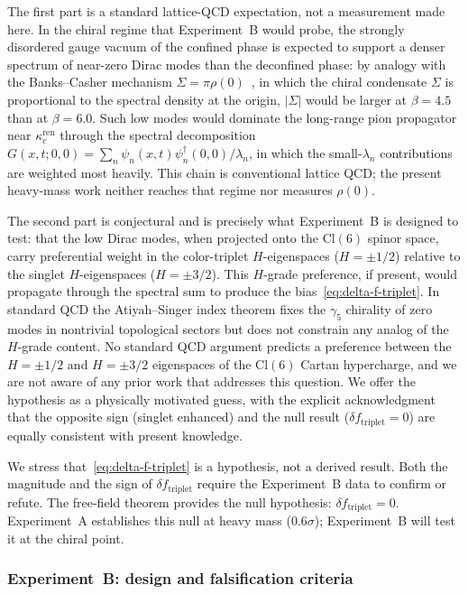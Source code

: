 \documentclass[12pt]{article}
\theoremstyle{definition}
\theoremstyle{remark}
\newcommand{\cl}{\mathrm{Cl}}           %
\newcommand{\kcren}{\kappa_{c}^{\mathrm{ren}}}      %
\newcommand{\dftriplet}{\delta f_{\mathrm{triplet}}}  %
\begin{document}
	The first part is a standard lattice-QCD expectation, not a measurement made
	here.  In the chiral regime that Experiment~B would probe, the strongly
	disordered gauge vacuum of the confined phase is expected to support a denser
	spectrum of near-zero Dirac modes than the deconfined phase: by analogy with
	the Banks--Casher mechanism $\Sigma=\pi\rho(0)$~\cite{BanksCasher1980}, in
	which the chiral condensate $\Sigma$ is proportional to the spectral density
	at the origin, $|\Sigma|$ would be larger at $\beta=4.5$ than at $\beta=6.0$.
	Such low modes would dominate the long-range pion propagator near $\kcren$
	through the spectral decomposition
	$G(x,t;0,0)=\sum_n\psi_n(x,t)\psi_n^\dagger(0,0)/\lambda_n$, in which the
	small-$\lambda_n$ contributions are weighted most heavily.  This chain is
	conventional lattice QCD; the present heavy-mass work neither reaches that
	regime nor measures $\rho(0)$.
	
	The second part is conjectural and is precisely what Experiment~B is designed
	to test: that the low Dirac modes, when projected onto the $\cl(6)$ spinor
	space, carry preferential weight in the color-triplet $H$-eigenspaces
	($H=\pm1/2$) relative to the singlet $H$-eigenspaces ($H=\pm3/2$).  This
	$H$-grade preference, if present, would propagate through the spectral sum to
	produce the bias~\eqref{eq:delta-f-triplet}.  In standard QCD the
	Atiyah--Singer index theorem fixes the $\gamma_5$ chirality of zero modes in
	nontrivial topological sectors but does not constrain any analog of the
	$H$-grade content.  No standard QCD argument predicts a preference between the
	$H=\pm1/2$ and $H=\pm3/2$ eigenspaces of the $\cl(6)$ Cartan hypercharge, and
	we are not aware of any prior work that addresses this question.  We offer the
	hypothesis as a physically motivated guess, with the explicit acknowledgment
	that the opposite sign (singlet enhanced) and the null result ($\dftriplet=0$)
	are equally consistent with present knowledge.
	
	We stress that~\eqref{eq:delta-f-triplet} is a hypothesis, not a derived
	result.  Both the magnitude and the sign of $\dftriplet$ require the
	Experiment~B data to confirm or refute.  The free-field theorem provides the
	null hypothesis: $\dftriplet=0$.  Experiment~A establishes this null at heavy
	mass ($0.6\sigma$); Experiment~B will test it at the chiral point.
	
	\subsubsection{Experiment~B: design and falsification criteria}
	\label{sec:experiment-B-design}
	
\end{document}
